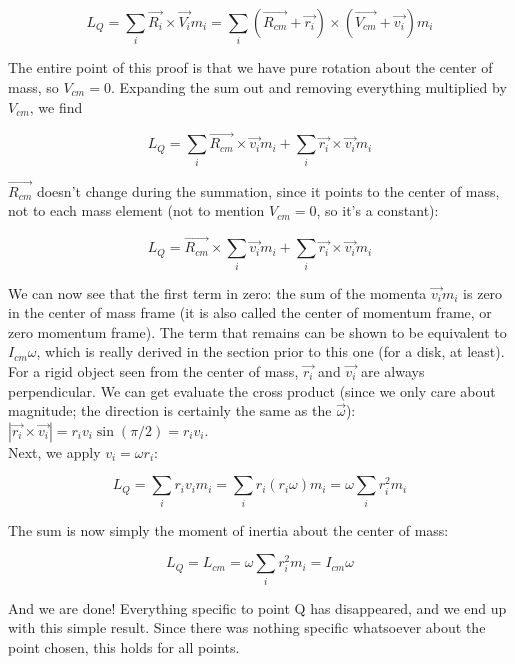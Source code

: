 \begin{equation}
L_Q = \sum_i \vec{R_i} \times \vec{V_i} m_i = \sum_i (\vec{R_{cm}} + \vec{r_i}) \times (\vec{V_{cm}} + \vec{v_i}) m_i
\end{equation}

The entire point of this proof is that we have pure rotation about the center of mass, so $V_{cm} = 0$. Expanding the sum out and removing everything multiplied by $V_{cm}$, we find

\begin{equation}
L_Q = \sum_i \vec{R_{cm}} \times \vec{v_i} m_i + \sum_i \vec{r_i} \times \vec{v_i} m_i
\end{equation}

$\vec{R_{cm}}$ doesn't change during the summation, since it points to the center of mass, not to each mass element (not to mention $V_{cm} = 0$, so it's a constant):

\begin{equation}
L_Q = \vec{R_{cm}} \times \sum_i \vec{v_i} m_i + \sum_i \vec{r_i} \times \vec{v_i} m_i
\end{equation}

We can now see that the first term in zero: the sum of the momenta $\vec{v_i} m_i$ is zero in the center of mass frame (it is also called the center of momentum frame, or zero momentum frame). The term that remains can be shown to be equivalent to $I_{cm} \omega$, which is really derived in the section prior to this one (for a disk, at least).\\ 
For a rigid object seen from the center of mass, $\vec{r_i}$ and $\vec{v_i}$ are always perpendicular. We can get evaluate the cross product (since we only care about magnitude; the direction is certainly the same as the $\vec{\omega}$): $|\vec{r_i} \times \vec{v_i}| = r_i v_i \sin (\pi/2) = r_i v_i$.\\
Next, we apply $v_i = \omega r_i$:

\begin{equation}
L_Q = \sum_i r_i v_i m_i = \sum_i r_i (r_i \omega) m_i = \omega \sum_i r_i^2 m_i
\end{equation}

The sum is now simply the moment of inertia about the center of mass:

\begin{equation}
L_Q = L_{cm} = \omega \sum_i r_i^2 m_i = I_{cm} \omega
\end{equation}

And we are done! Everything specific to point Q has disappeared, and we end up with this simple result. Since there was nothing specific whatsoever about the point chosen, this holds for all points.


